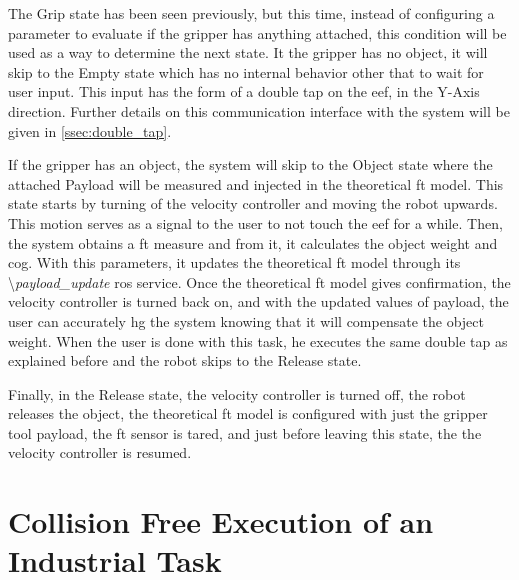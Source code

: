\par The Grip state has been seen previously, but this time, instead of configuring a parameter to evaluate if the gripper has anything attached, this condition will be used as a way to determine the next state. It the gripper has no object, it will skip to the Empty state which has no internal behavior other that to wait for user input. This input has the form of a double tap on the \ac{eef}, in the Y-Axis direction. Further details on this communication interface with the system will be given in \autoref{ssec:double_tap}.

\par If the gripper has an object, the system will skip to the Object state where the attached Payload will be measured and injected in the theoretical \ac{ft} model. This state starts by turning of the velocity controller and moving the robot upwards. This motion serves as a signal to the user to not touch the \ac{eef} for a while. Then, the system obtains a \ac{ft} measure and from it, it calculates the object weight and \ac{cog}. With this parameters, it updates the theoretical \ac{ft} model through its \textbackslash\textit{payload\_update} \ac{ros} service. Once the theoretical \ac{ft} model gives confirmation, the velocity controller is turned back on, and with the updated values of payload, the user can accurately \ac{hg} the system knowing that it will compensate the object weight. When the user is done with this task, he executes the same double tap as explained before and the robot skips to the Release state.

\par Finally, in the Release state, the velocity controller is turned off, the robot releases the object, the theoretical \ac{ft} model is configured with just the gripper tool payload, the \ac{ft} sensor is tared, and just before leaving this state, the the velocity controller is resumed.






\section{Collision Free Execution of an Industrial Task}


